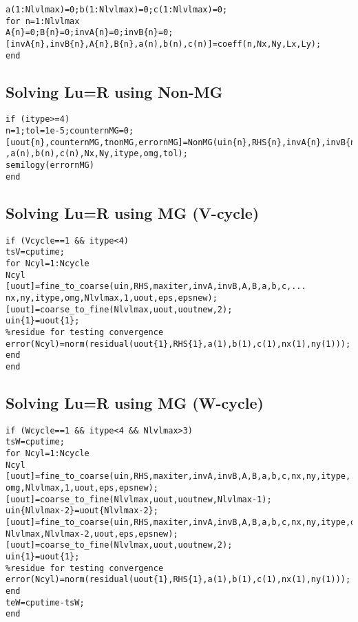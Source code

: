 \documentclass[11pt]{report}
\begin{document}
\begin{appendices}
\begin{verbatim}
a(1:Nlvlmax)=0;b(1:Nlvlmax)=0;c(1:Nlvlmax)=0;
for n=1:Nlvlmax
A{n}=0;B{n}=0;invA{n}=0;invB{n}=0;
[invA{n},invB{n},A{n},B{n},a(n),b(n),c(n)]=coeff(n,Nx,Ny,Lx,Ly);
end
\end{verbatim}


\subsection*{Solving Lu=R using Non-MG}

\begin{verbatim}
if (itype>=4)
n=1;tol=1e-5;counternMG=0;
[uout{n},counternMG,tnonMG,errornMG]=NonMG(uin{n},RHS{n},invA{n},invB{n}...
,a(n),b(n),c(n),Nx,Ny,itype,omg,tol);
semilogy(errornMG)
end
\end{verbatim}


\subsection*{Solving Lu=R using MG (V-cycle)}

\begin{verbatim}
if (Vcycle==1 && itype<4)
tsV=cputime;
for Ncyl=1:Ncycle
Ncyl
[uout]=fine_to_coarse(uin,RHS,maxiter,invA,invB,A,B,a,b,c,...
nx,ny,itype,omg,Nlvlmax,1,uout,eps,epsnew);
[uout]=coarse_to_fine(Nlvlmax,uout,uoutnew,2);
uin{1}=uout{1};
%residue for testing convergence
error(Ncyl)=norm(residual(uout{1},RHS{1},a(1),b(1),c(1),nx(1),ny(1)));
end
end
\end{verbatim}



\subsection*{Solving Lu=R using MG (W-cycle)}

\begin{verbatim}
if (Wcycle==1 && itype<4 && Nlvlmax>3)
tsW=cputime;
for Ncyl=1:Ncycle
Ncyl
[uout]=fine_to_coarse(uin,RHS,maxiter,invA,invB,A,B,a,b,c,nx,ny,itype,...
omg,Nlvlmax,1,uout,eps,epsnew);
[uout]=coarse_to_fine(Nlvlmax,uout,uoutnew,Nlvlmax-1);
uin{Nlvlmax-2}=uout{Nlvlmax-2};
[uout]=fine_to_coarse(uin,RHS,maxiter,invA,invB,A,B,a,b,c,nx,ny,itype,omg,...
Nlvlmax,Nlvlmax-2,uout,eps,epsnew);
[uout]=coarse_to_fine(Nlvlmax,uout,uoutnew,2);
uin{1}=uout{1};
%residue for testing convergence
error(Ncyl)=norm(residual(uout{1},RHS{1},a(1),b(1),c(1),nx(1),ny(1)));
end
teW=cputime-tsW;
end
\end{verbatim}



\end{appendices}
\end{document}
